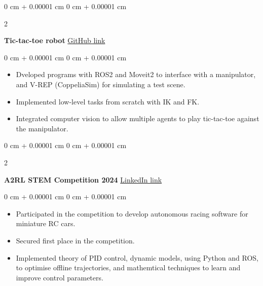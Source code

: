 \documentclass[10pt, letterpaper]{article}
\newenvironment{highlights}{
    \begin{itemize}[
        topsep=0.10 cm,
        parsep=0.10 cm,
        partopsep=0pt,
        itemsep=0pt,
        leftmargin=0 cm + 10pt
    ]
}{
    \end{itemize}
} %
\newenvironment{onecolentry}{
    \begin{adjustwidth}{
        0 cm + 0.00001 cm
    }{
        0 cm + 0.00001 cm
    }
}{
    \end{adjustwidth}
} %
\newenvironment{twocolentry}[2][]{
    \onecolentry
    \def\secondColumn{#2}
    \setcolumnwidth{\fill, 4.5 cm}
    \begin{paracol}{2}
}{
    \switchcolumn \raggedleft \secondColumn
    \end{paracol}
    \endonecolentry
} %
\begin{document}
        \begin{twocolentry}{
            \href{https://github.com/Abban-Fahim/b38ro-project/}{GitHub link}
        }
            \textbf{Tic-tac-toe robot}\end{twocolentry}

        \vspace{0.10 cm}
        \begin{onecolentry}
            \begin{highlights}
            \item Dveloped programs with ROS2 and Moveit2 to interface with a manipulator, and V-REP (CoppeliaSim) for simulating a test scene.
            \item Implemented low-level tasks from scratch with IK and FK.
            \item Integrated computer vision to allow multiple agents to play tic-tac-toe against the manipulator.
            \end{highlights}
        \end{onecolentry}

        \vspace{0.2 cm}

        \begin{twocolentry}{
            \href{https://www.linkedin.com/posts/abban-fahim_extremely-happy-to-announce-my-team-at-heriot-watt-activity-7191019075861409793-ZwxJ?utm_source=social_share_sheet&utm_medium=member_desktop_web}{LinkedIn link}
        }
        \textbf{A2RL STEM Competition 2024}\end{twocolentry}
        
        \vspace{0.10 cm}
        \begin{onecolentry}
            \begin{highlights}
                \item Participated in the competition to develop autonomous racing software for miniature RC cars.
                \item Secured first place in the competition.
                \item Implemented theory of PID control, dynamic models, using Python and ROS, to optimise offline trajectories, and mathemtical techniques to learn and improve control parameters.
            \end{highlights}

        \end{onecolentry}

        \vspace{0.2 cm}
\end{document}
